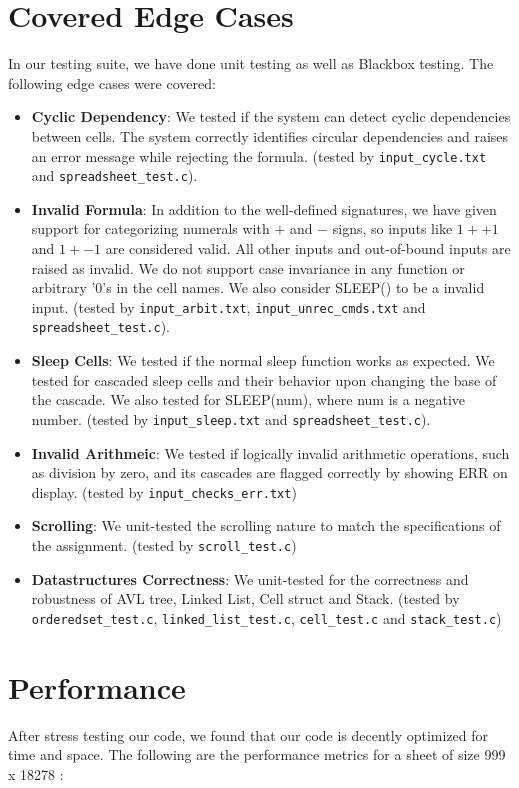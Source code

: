 \documentclass[10pt,a4paper]{article}  %
\begin{document}
\section{Covered Edge Cases}

In our testing suite, we have done unit testing as well as Blackbox testing.
The following edge cases were covered:

\begin{itemize}
    \item \textbf{Cyclic Dependency}: We tested if the system can detect cyclic dependencies between cells. The system correctly identifies circular dependencies and raises an error message while rejecting the formula. (tested by \texttt{input\_cycle.txt} and \texttt{spreadsheet\_test.c}).
    \item \textbf{Invalid Formula}: In addition to the well-defined signatures, we have given support for categorizing numerals with \(+\) and \(-\) signs, so inputs like \(1++1\) and \(1+-1\) are considered valid. All other inputs and out-of-bound inputs are raised as invalid. We do not support case invariance in any function or arbitrary '0's in the cell names. We also consider SLEEP() to be a invalid input. (tested by \texttt{input\_arbit.txt}, \texttt{input\_unrec\_cmds.txt} and \texttt{spreadsheet\_test.c}).
    \item \textbf{Sleep Cells}: We tested if the normal sleep function works as expected. We tested for cascaded sleep cells and their behavior upon changing the base of the cascade. We also tested for SLEEP(num), where num is a negative number. (tested by \texttt{input\_sleep.txt} and \texttt{spreadsheet\_test.c}).
    \item \textbf{Invalid Arithmeic}: We tested if logically invalid arithmetic operations, such as division by zero, and its cascades are flagged correctly by showing ERR on display. (tested by \texttt{input\_checks\_err.txt})
    \item \textbf{Scrolling}: We unit-tested the scrolling nature to match the specifications of the assignment. (tested by \texttt{scroll\_test.c})
    \item \textbf{Datastructures Correctness}: We unit-tested for the correctness and robustness of AVL tree, Linked List, Cell struct and Stack. (tested by \texttt{orderedset\_test.c}, \texttt{linked\_list\_test.c}, \texttt{cell\_test.c} and \texttt{stack\_test.c})
\end{itemize}

\section{Performance}
After stress testing our code, we found that our code is decently optimized for time and space. The following are the performance metrics for a sheet of size 999 x 18278 :
\end{document}
